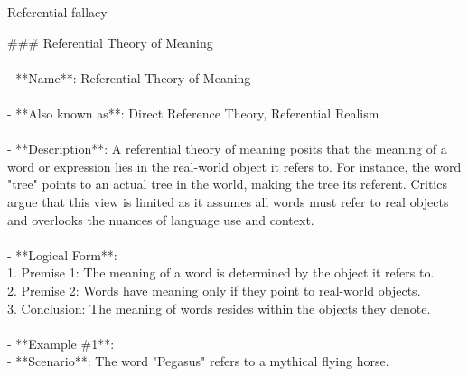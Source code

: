 \documentclass[a4paper,12pt,single,pdftex]{scrartcl}
\begin{document}
  

Referential fallacy
    
      \#\#\# Referential Theory of Meaning
    \\

    
      
    \\

    
      - **Name**: Referential Theory of Meaning
    \\

    
      
    \\

    
      - **Also known as**: Direct Reference Theory, Referential Realism
    \\

    
      
    \\

    
      - **Description**: A referential theory of meaning posits that the meaning of a word or expression lies in the real-world object it refers to. For instance, the word "tree" points to an actual tree in the world, making the tree its referent. Critics argue that this view is limited as it assumes all words must refer to real objects and overlooks the nuances of language use and context.
    \\

    
      
    \\

    
      - **Logical Form**:
    \\

    
        1. Premise 1: The meaning of a word is determined by the object it refers to.
    \\

    
        2. Premise 2: Words have meaning only if they point to real-world objects.
    \\

    
        3. Conclusion: The meaning of words resides within the objects they denote.
    \\

    
      
    \\

    
      - **Example \#1**:
    \\

    
        - **Scenario**: The word "Pegasus" refers to a mythical flying horse.
    \\
\end{document}
